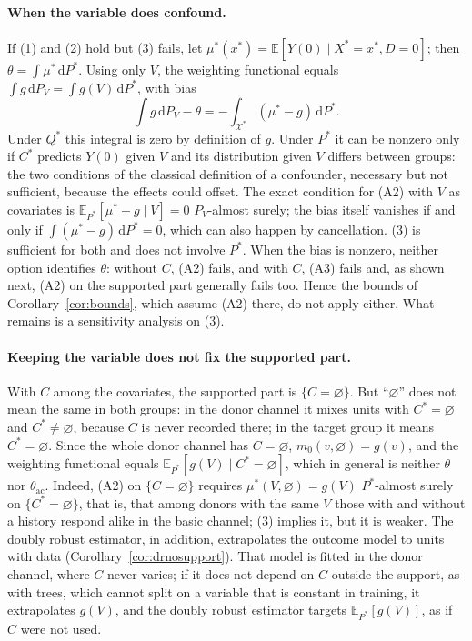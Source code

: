 \documentclass[twoside,11pt]{article}
\newcommand{\E}{\mathbb{E}}
\newcommand{\X}{\mathcal{X}}
\newcommand{\dd}{\,\mathrm{d}}
\newcommand{\thac}{\theta_{\mathrm{ac}}}
\newcommand{\vacio}{\varnothing}
\theoremstyle{plain}
\theoremstyle{definition}
\begin{document}
\paragraph{When the variable does confound.} If (1) and (2) hold but (3) fails, let $\mu^*(x^*)=\E[Y(0)\mid X^*=x^*,D=0]$; then $\theta=\int\mu^*\dd P^*$. Using only $V$, the weighting functional equals $\int g\dd P_V=\int g(V)\dd P^*$, with bias
\[
\int g\dd P_V-\theta=-\int_{\X^*}(\mu^*-g)\dd P^*.
\]
Under $Q^*$ this integral is zero by definition of $g$. Under $P^*$ it can be nonzero only if $C^*$ predicts $Y(0)$ given $V$ and its distribution given $V$ differs between groups: the two conditions of the classical definition of a confounder, necessary but not sufficient, because the effects could offset. The exact condition for (A2) with $V$ as covariates is $\E_{P^*}[\mu^*-g\mid V]=0$ $P_V$-almost surely; the bias itself vanishes if and only if $\int(\mu^*-g)\dd P^*=0$, which can also happen by cancellation. (3) is sufficient for both and does not involve $P^*$. When the bias is nonzero, neither option identifies $\theta$: without $C$, (A2) fails, and with $C$, (A3) fails and, as shown next, (A2) on the supported part generally fails too. Hence the bounds of Corollary~\ref{cor:bounds}, which assume (A2) there, do not apply either. What remains is a sensitivity analysis on (3).

\paragraph{Keeping the variable does not fix the supported part.} With $C$ among the covariates, the supported part is $\{C=\vacio\}$. But ``$\vacio$'' does not mean the same in both groups: in the donor channel it mixes units with $C^*=\vacio$ and $C^*\ne\vacio$, because $C$ is never recorded there; in the target group it means $C^*=\vacio$. Since the whole donor channel has $C=\vacio$, $m_0(v,\vacio)=g(v)$, and the weighting functional equals $\E_{P^*}[g(V)\mid C^*=\vacio]$, which in general is neither $\theta$ nor $\thac$. Indeed, (A2) on $\{C=\vacio\}$ requires $\mu^*(V,\vacio)=g(V)$ $P^*$-almost surely on $\{C^*=\vacio\}$, that is, that among donors with the same $V$ those with and without a history respond alike in the basic channel; (3) implies it, but it is weaker. The doubly robust estimator, in addition, extrapolates the outcome model to units with data (Corollary~\ref{cor:drnosupport}). That model is fitted in the donor channel, where $C$ never varies; if it does not depend on $C$ outside the support, as with trees, which cannot split on a variable that is constant in training, it extrapolates $g(V)$, and the doubly robust estimator targets $\E_{P^*}[g(V)]$, as if $C$ were not used.
\end{document}
